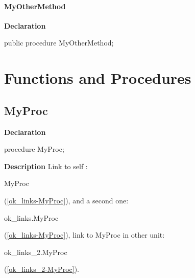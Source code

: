 \documentclass{report}
\newif\ifpdf
\begin{document}
\paragraph*{MyOtherMethod}\hspace*{\fill}

\label{ok_links.TSomeClass-MyOtherMethod}
\begin{list}{}{
\setlength{\itemindent}{0cm}
\setlength{\listparindent}{0cm}
\setlength{\leftmargin}{\evensidemargin}
\addtolength{\leftmargin}{\tmplength}
\settowidth{\labelsep}{X}
\addtolength{\leftmargin}{\labelsep}
\setlength{\labelwidth}{\tmplength}
}
\item[\textbf{Declaration}\hfill]
\ifpdf
\begin{flushleft}
\fi
\begin{ttfamily}
public procedure MyOtherMethod;\end{ttfamily}

\ifpdf
\end{flushleft}
\fi

\end{list}
\section{Functions and Procedures}
\ifpdf
\subsection*{\large{\textbf{MyProc}}\normalsize\hspace{1ex}\hrulefill}
\else
\subsection*{MyProc}
\fi
\label{ok_links-MyProc}
\begin{list}{}{
\setlength{\itemindent}{0cm}
\setlength{\listparindent}{0cm}
\setlength{\leftmargin}{\evensidemargin}
\addtolength{\leftmargin}{\tmplength}
\settowidth{\labelsep}{X}
\addtolength{\leftmargin}{\labelsep}
\setlength{\labelwidth}{\tmplength}
}
\item[\textbf{Declaration}\hfill]
\ifpdf
\begin{flushleft}
\fi
\begin{ttfamily}
procedure MyProc;\end{ttfamily}

\ifpdf
\end{flushleft}
\fi

\par
\item[\textbf{Description}]
Link to self : \begin{ttfamily}MyProc\end{ttfamily}(\ref{ok_links-MyProc}), and a second one: \begin{ttfamily}ok{\_}links.MyProc\end{ttfamily}(\ref{ok_links-MyProc}), link to MyProc in other unit: \begin{ttfamily}ok{\_}links{\_}2.MyProc\end{ttfamily}(\ref{ok_links_2-MyProc}).

\end{list}
\end{document}
